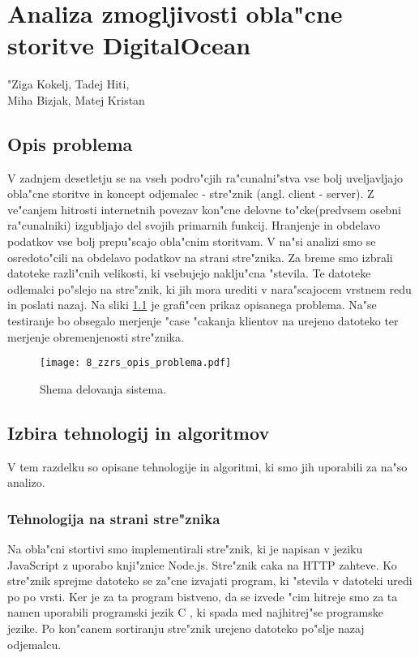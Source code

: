 \chapter[Analiza zmogljivosti obla"cne storitve DigitalOcean]{Analiza zmogljivosti obla"cne storitve DigitalOcean}

\pagestyle{fancy}
\fancyhf{}
\fancyhead[LE,RO]{\thepage}
\fancyhead[RE,LO]{\leftmark}

\huge "Ziga Kokelj, Tadej Hiti,\\Miha Bizjak, Matej Kristan
\normalsize
\bigskip

\section{Opis problema} \label{8_opis_problema}
\noindent V zadnjem desetletju se na vseh podro"cjih ra"cunalni"stva vse bolj uveljavljajo obla"cne storitve in koncept odjemalec - stre"znik (angl. client - server). Z ve"canjem hitrosti internetnih povezav kon"cne delovne to"cke(predvsem osebni ra"cunalniki) izgubljajo del svojih primarnih funkcij. Hranjenje in obdelavo podatkov vse bolj prepu"scajo obla"cnim storitvam. V na"si analizi smo se osredoto"cili na obdelavo podatkov na strani stre"znika. Za breme smo izbrali datoteke razli"cnih velikosti, ki vsebujejo naklju"cna "stevila. Te datoteke odlemalci po"slejo na stre"znik, ki jih mora urediti v nara"scajocem vrstnem redu in poslati nazaj.  Na sliki \ref{8_opis_problema} je grafi"cen prikaz opisanega problema. Na"se testiranje bo obsegalo merjenje  "case "cakanja  klientov na urejeno datoteko ter merjenje obremenjenosti stre"znika. 

\begin{figure}
  \centering
    \texttt{[image: 8\_zzrs\_opis\_problema.pdf]}
  \caption{Shema delovanja sistema.}
  \label{8_opis_problema}
\end{figure}


\section{Izbira tehnologij in algoritmov}
V tem razdelku so opisane tehnologije in algoritmi, ki smo jih uporabili za na"so analizo.


\subsection{Tehnologija na strani stre"znika }
Na obla"cni stortivi smo implementirali stre"znik, ki je napisan v jeziku JavaScript \cite{8_js} z uporabo knji"znice Node.js. Stre"znik caka na HTTP zahteve. Ko stre"znik sprejme datoteko se za"cne izvajati program, ki "stevila v datoteki uredi po po vrsti. Ker je za ta program bistveno, da se izvede "cim hitreje smo za ta namen uporabili programski jezik C \cite{8_c}, ki spada med najhitrej"se programske jezike. Po kon"canem sortiranju stre"znik urejeno datoteko po"slje nazaj odjemalcu. 

